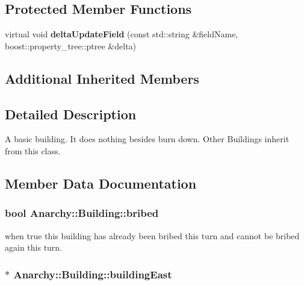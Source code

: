 \subsection*{Protected Member Functions}
\begin{DoxyCompactItemize}
\item 
\hypertarget{classAnarchy_1_1Building_af5ecbdb03b63bdd2fa38ac599bf74410}{virtual void {\bfseries delta\-Update\-Field} (const std\-::string \&field\-Name, boost\-::property\-\_\-tree\-::ptree \&delta)}\label{classAnarchy_1_1Building_af5ecbdb03b63bdd2fa38ac599bf74410}

\end{DoxyCompactItemize}
\subsection*{Additional Inherited Members}


\subsection{Detailed Description}
A basic building. It does nothing besides burn down. Other Buildings inherit from this class. 



\subsection{Member Data Documentation}
\hypertarget{classAnarchy_1_1Building_a2d0079a53d7239ad72be834a168a29a4}{
\subsubsection[{bribed}]{\setlength{\rightskip}{0pt plus 5cm}bool Anarchy\-::\-Building\-::bribed}}\label{classAnarchy_1_1Building_a2d0079a53d7239ad72be834a168a29a4}


when true this building has already been bribed this turn and cannot be bribed again this turn. 

\hypertarget{classAnarchy_1_1Building_aeecf09082fb73c6b6df35fda22431d79}{
\subsubsection[{building\-East}]{$\ast$ Anarchy\-::\-Building\-::building\-East}}\label{classAnarchy_1_1Building_aeecf09082fb73c6b6df35fda22431d79}


